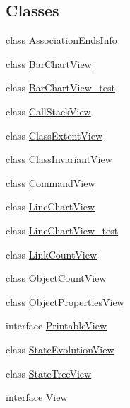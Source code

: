\subsection*{Classes}
\begin{DoxyCompactItemize}
\item 
class \hyperlink{classorg_1_1tzi_1_1use_1_1gui_1_1views_1_1_association_ends_info}{Association\-Ends\-Info}
\item 
class \hyperlink{classorg_1_1tzi_1_1use_1_1gui_1_1views_1_1_bar_chart_view}{Bar\-Chart\-View}
\item 
class \hyperlink{classorg_1_1tzi_1_1use_1_1gui_1_1views_1_1_bar_chart_view__test}{Bar\-Chart\-View\-\_\-test}
\item 
class \hyperlink{classorg_1_1tzi_1_1use_1_1gui_1_1views_1_1_call_stack_view}{Call\-Stack\-View}
\item 
class \hyperlink{classorg_1_1tzi_1_1use_1_1gui_1_1views_1_1_class_extent_view}{Class\-Extent\-View}
\item 
class \hyperlink{classorg_1_1tzi_1_1use_1_1gui_1_1views_1_1_class_invariant_view}{Class\-Invariant\-View}
\item 
class \hyperlink{classorg_1_1tzi_1_1use_1_1gui_1_1views_1_1_command_view}{Command\-View}
\item 
class \hyperlink{classorg_1_1tzi_1_1use_1_1gui_1_1views_1_1_line_chart_view}{Line\-Chart\-View}
\item 
class \hyperlink{classorg_1_1tzi_1_1use_1_1gui_1_1views_1_1_line_chart_view__test}{Line\-Chart\-View\-\_\-test}
\item 
class \hyperlink{classorg_1_1tzi_1_1use_1_1gui_1_1views_1_1_link_count_view}{Link\-Count\-View}
\item 
class \hyperlink{classorg_1_1tzi_1_1use_1_1gui_1_1views_1_1_object_count_view}{Object\-Count\-View}
\item 
class \hyperlink{classorg_1_1tzi_1_1use_1_1gui_1_1views_1_1_object_properties_view}{Object\-Properties\-View}
\item 
interface \hyperlink{interfaceorg_1_1tzi_1_1use_1_1gui_1_1views_1_1_printable_view}{Printable\-View}
\item 
class \hyperlink{classorg_1_1tzi_1_1use_1_1gui_1_1views_1_1_state_evolution_view}{State\-Evolution\-View}
\item 
class \hyperlink{classorg_1_1tzi_1_1use_1_1gui_1_1views_1_1_state_tree_view}{State\-Tree\-View}
\item 
interface \hyperlink{interfaceorg_1_1tzi_1_1use_1_1gui_1_1views_1_1_view}{View}
\end{DoxyCompactItemize}
